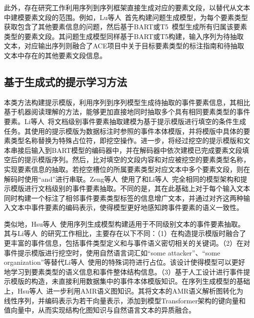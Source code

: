 
此外，存在研究工作利用序列到序列框架直接生成对应的要素文段，以替代从文本中建模要素文段的范围。例如，Lu等人~\cite{lu2023event}首先构建问题生成模型，为每个要素类型获取包含了其他要素信息的问题，然后基于BART或T5~\cite{raffel2020exploring}模型生成所有归属该要素类型的要素文段。其问题生成模型同样基于BART或T5构建，输入序列为待抽取文本，对应输出序列则融合了ACE项目中关于目标要素类型的标注指南和待抽取文本中存在的其他要素文段信息。


\subsection{基于生成式的提示学习方法}

本类方法构建提示模版，利用序列到序列模型生成待抽取的事件要素信息，其相比基于机器阅读理解的方法，能够更加直接地同时抽取多个具有相同要素类型的事件要素。Li等人~\cite{li2021document}将文档级别事件要素抽取建模为基于提示模版进行填空的条件生成任务。其使用的提示模版为数据标注时参照的事件本体模版，并将模版中具体的要素类型名称替换为特殊占位符，即挖空操作。进一步，将经过挖空的提示模版和文本串接后输入到BART模型的编码器中，并在解码器中依次建模已完成要素文段填空后的提示模版序列。然后，比对填空的文段内容和对应被挖空的要素类型名称，实现要素信息的抽取。若挖空槽位的所属要素类型对应文本中多个要素文段，则在解码时使用“and”进行串联。Zeng等人~\cite{zeng2022ea2e}使用了和Li等人~\cite{li2021document}完全相同的模型架构和提示模版进行文档级别的事件要素抽取。不同的是，其在此基础上对于每个输入文本同时构建一个标注了相邻事件要素类型标签的信息增广文本，并通过对齐这两种输入文本中事件要素的编码表示，使得模型更好地感知跨事件要素的语义一致性。

类似地，Hsu等人~\cite{hsu2022degree}使用序列生成模型构建适用于不同级别文本的事件要素抽取。其与Li等人~\cite{li2021document}的研究工作相比，主要存在以下不同：（1）在构造提示模版时融合了更丰富的事件信息，包括事件类型定义和与事件语义密切相关的关键词。（2）在对事件提示模版进行挖空时，使用自然语言词汇如“some attacker”、“some organization”等替代Li等人~\cite{li2021document}使用的特殊词符进行占位。该设计使得模型可以更好地学习到要素类型的语义信息和事件整体结构信息。（3）基于人工设计进行事件提示模版的构造，未直接利用数据集中的事件本体模版知识。在序列生成模型的基础上，Hsu等人~\cite{hsu2023ampere}进一步利用AMR语义图知识。其将文本的AMR语义解析图转化为线性序列，并编码表示为若干向量表示，添加到模型Transformer架构的键向量和值向量中，从而实现结构化图知识与自然语言文本的异质融合。

